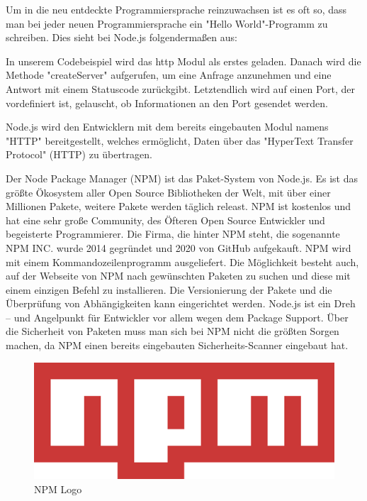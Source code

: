 Um in die neu entdeckte Programmiersprache reinzuwachsen ist es oft so, dass man bei jeder neuen Programmiersprache ein "Hello World"-Programm zu schreiben. Dies sieht bei Node.js folgendermaßen aus:


In unserem Codebeispiel wird das http Modul als erstes geladen. Danach wird die Methode "createServer" aufgerufen, um eine Anfrage anzunehmen und eine Antwort mit einem Statuscode zurückgibt. Letztendlich wird auf einen Port, der vordefiniert ist, gelauscht, ob Informationen an den Port gesendet werden.

Node.js wird den Entwicklern mit dem bereits eingebauten Modul namens "HTTP" bereitgestellt, welches ermöglicht, Daten über das "HyperText Transfer Protocol" (HTTP) zu übertragen. \cite{HelloWorld}


Der Node Package Manager (NPM) ist das Paket-System von Node.js. Es ist das größte Ökosystem aller Open Source Bibliotheken der Welt, mit über einer Millionen Pakete, weitere Pakete werden täglich releast. NPM ist kostenlos und hat eine sehr große Community, des Öfteren Open Source Entwickler und begeisterte Programmierer. Die Firma, die hinter NPM steht, die sogenannte NPM INC. wurde 2014 gegründet und 2020 von GitHub aufgekauft.
NPM wird mit einem Kommandozeilenprogramm ausgeliefert. Die Möglichkeit besteht auch, auf der Webseite von NPM nach gewünschten Paketen zu suchen und diese mit einem einzigen Befehl zu installieren. Die Versionierung der Pakete und die Überprüfung von Abhängigkeiten kann eingerichtet werden. Node.js ist ein Dreh – und Angelpunkt für Entwickler vor allem wegen dem Package Support.
Über die Sicherheit von Paketen muss man sich bei NPM nicht die größten Sorgen machen, da NPM einen bereits eingebauten Sicherheits-Scanner eingebaut hat. \cite{NPM} \cite{NPM2}

\begin{figure}[H]
    \centering
    \includegraphics{media/NodeJs/NPM.png}
    \caption{NPM Logo\cite{NPMLOGO}}
\end{figure}
